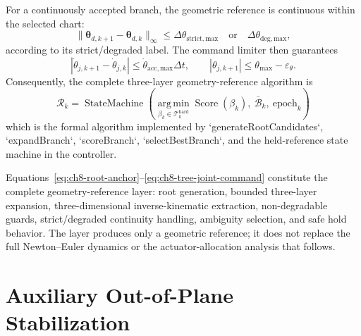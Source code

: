 \documentclass[12pt,a4paper]{report}
\begin{document}
For a continuously accepted branch, the geometric reference is continuous
within the selected chart:
\begin{equation}
\|\boldsymbol{\theta}_{d,k+1}
-\boldsymbol{\theta}_{d,k}\|_\infty
\leq\Delta\theta_{\mathrm{strict,max}}
\quad\text{or}\quad
\Delta\theta_{\mathrm{deg,max}},
\tag{8.146}
\label{eq:ch8-reference-continuity}
\end{equation}
according to its strict/degraded label. The command limiter then guarantees
\begin{equation}
\left|\dot\theta_{j,k+1}-\dot\theta_{j,k}\right|
\leq\dot\theta_{\mathrm{acc,max}}\Delta t,\qquad
|\theta_{j,k+1}|\leq\theta_{\max}-\varepsilon_\theta .
\tag{8.147}
\label{eq:ch8-command-safety}
\end{equation}
Consequently, the complete three-layer geometry-reference algorithm is
\begin{equation}
\boxed{
\mathcal{R}_k=
\operatorname{StateMachine}\!\left(
\operatorname*{arg\,min}_{\beta_k\in\mathcal{T}^{\mathrm{hard}}_k}
\operatorname{Score}(\beta_k),\
\bar{\mathcal{B}}_k,\
\mathrm{epoch}_k
\right)}
\tag{8.148}
\label{eq:ch8-complete-tree-algorithm}
\end{equation}
which is the formal algorithm implemented by
`generateRootCandidates`, `expandBranch`, `scoreBranch`,
`selectBestBranch`, and the held-reference state machine in the controller.

Equations~\eqref{eq:ch8-root-anchor}--\eqref{eq:ch8-tree-joint-command}
constitute the complete geometry-reference layer: root generation, bounded
three-layer expansion, three-dimensional inverse-kinematic extraction,
non-degradable guards, strict/degraded continuity handling, ambiguity
selection, and safe hold behavior. The layer produces only a geometric
reference; it does not replace the full Newton--Euler dynamics or the
actuator-allocation analysis that follows.

\section{Auxiliary Out-of-Plane Stabilization}
\end{document}
